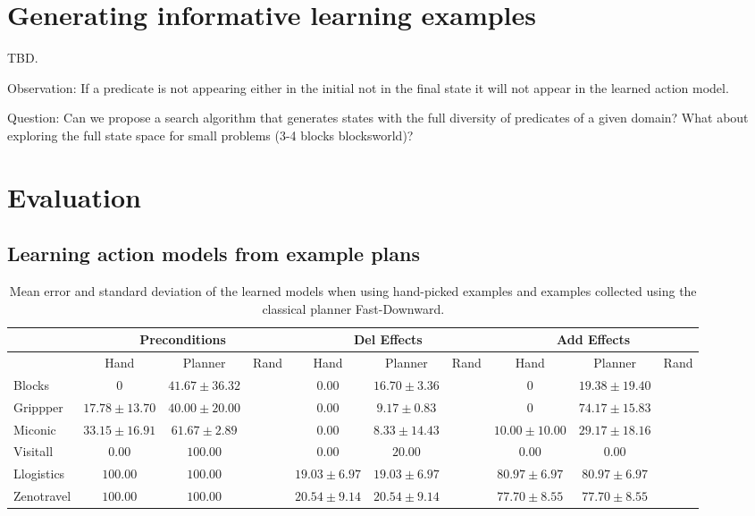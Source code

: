 \documentclass[letterpaper]{article} %
\begin{document}
\section{Generating informative learning examples}
TBD.

Observation: If a predicate is not appearing either in the initial not in the final state it will not appear in the learned action model.

Question: Can we propose a search algorithm that generates states with the full diversity of predicates of a given domain? What about exploring the full state space for small problems (3-4 blocks blocksworld)?


\section{Evaluation}

\subsection{Learning action models from example plans}
\begin{table*}[!hbt]
\begin{footnotesize}
\begin{tabular}{l||c|c|c||c|c|c||c|c|c}
 & \multicolumn{3}{c||}{Preconditions} & \multicolumn{3}{c||}{Del Effects} & \multicolumn{3}{c}{Add Effects} \\\hline
 & Hand & Planner & Rand & Hand & Planner & Rand & Hand & Planner & Rand \\\hline
Blocks &  $0$ & $41.67\pm 36.32$ & & $0.00$ & $16.70\pm 3.36$ & & $0$ & $19.38\pm 19.40$&\\
Grippper & $17.78\pm13.70$ & $40.00\pm 20.00$ & & $0.00$ & $9.17\pm 0.83$ & & $0$ & $74.17\pm 15.83$&\\
Miconic & $33.15\pm 16.91$ & $61.67\pm 2.89$ & & $0.00$ & $8.33\pm 14.43$ & & $10.00\pm 10.00$ & $29.17\pm 18.16$&\\
Visitall & $0.00$ & $100.00$ & & $0.00$ & $20.00$ & & $0.00$ & $0.00$&\\
Llogistics & $100.00$& $100.00$ & & $19.03\pm 6.97$ & $19.03\pm 6.97$ & & $80.97\pm6.97$& $80.97\pm6.97$&\\
Zenotravel & $100.00$& $100.00$ & & $20.54\pm 9.14$ & $20.54\pm 9.14$ & & $77.70\pm 8.55$ &$77.70\pm 8.55$ &

\end{tabular}
\end{footnotesize}
\caption{\small Mean error and standard deviation of the learned models when using hand-picked examples and examples collected using the classical planner Fast-Downward.}
  \label{tab:eplans}
\end{table*}
\end{document}
